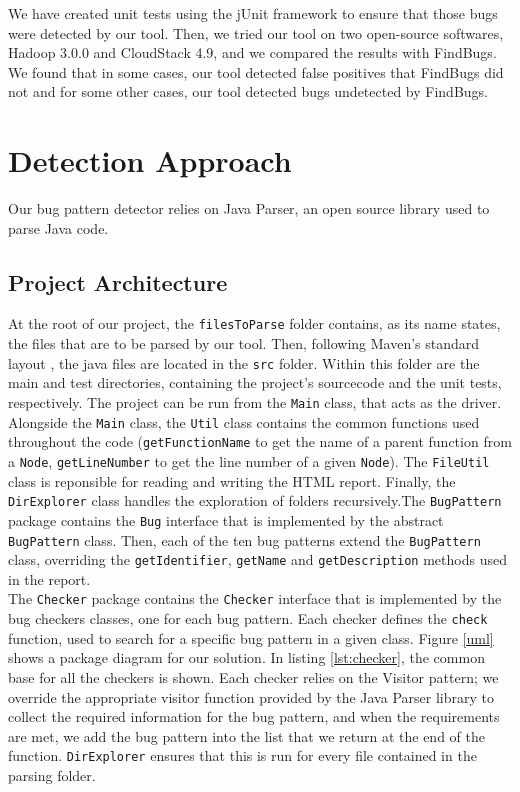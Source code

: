 \documentclass[sigconf]{acmart}
\begin{document}
We have created unit tests using the jUnit framework to ensure that those bugs were detected by our tool. Then, we tried our tool on two open-source softwares, Hadoop 3.0.0 and CloudStack 4.9, and we compared the results with FindBugs. We found that in some cases, our tool detected false positives that FindBugs did not and for some other cases, our tool detected bugs undetected by FindBugs.

\section{Detection Approach}
Our bug pattern detector relies on Java Parser, an open source library used to parse Java code.
\subsection{Project Architecture} At the root of our project, the \texttt{filesToParse} folder contains, as its name states, the files that are to be parsed by our tool. Then, following Maven's standard layout \cite{mavenlayout}, the java files are located in the \texttt{src} folder. Within this folder are the main and test directories, containing the project's sourcecode and the unit tests, respectively. The project can be run from the \texttt{Main} class, that acts as the driver. Alongside the \texttt{Main} class, the \texttt{Util} class contains the common functions used throughout the code (\texttt{getFunctionName} to get the name of a parent function from a \texttt{Node}, \texttt{getLineNumber} to get the line number of a given \texttt{Node}). The \texttt{FileUtil} class is reponsible for reading and writing the HTML report. Finally, the \texttt{DirExplorer} class handles the exploration of folders recursively.The \texttt{BugPattern} package contains the \texttt{Bug} interface that is implemented by the abstract \texttt{BugPattern} class. Then, each of the ten bug patterns extend the \texttt{BugPattern} class, overriding the \texttt{getIdentifier}, \texttt{getName} and \texttt{getDescription} methods used in the report.\\The \texttt{Checker} package contains the \texttt{Checker} interface that is implemented by the bug checkers classes, one for each bug pattern. Each checker defines the \texttt{check} function, used to search for a specific bug pattern in a given class. Figure \ref{uml} shows a package diagram for our solution. In listing \ref{lst:checker}, the common base for all the checkers is shown. Each checker relies on the Visitor pattern; we override the appropriate visitor function provided by the Java Parser library to collect the required information for the bug pattern, and when the requirements are met, we add the bug pattern into the list that we return at the end of the function. \texttt{DirExplorer} ensures that this is run for every file contained in the parsing folder.
\end{document}
